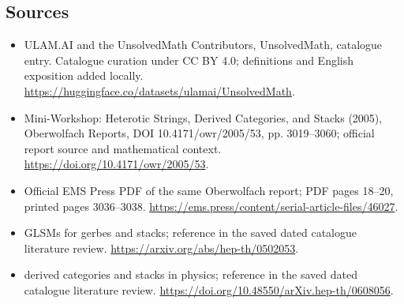 \documentclass[11pt]{article}
\begin{document}
\subsection{Sources}
\begin{itemize}
\item[\hypertarget{source:statement:1}{S1}] ULAM.AI and the UnsolvedMath Contributors, UnsolvedMath, catalogue entry. Catalogue curation under CC BY 4.0; definitions and English exposition added locally.
\url{https://huggingface.co/datasets/ulamai/UnsolvedMath}.
\item[\hypertarget{source:statement:2}{S2}] Mini-Workshop: Heterotic Strings, Derived Categories, and Stacks (2005), Oberwolfach Reports, DOI 10.4171/owr/2005/53, pp. 3019--3060; official report source and mathematical context.
\url{https://doi.org/10.4171/owr/2005/53}.
\item[\hypertarget{source:statement:3}{S3}] Official EMS Press PDF of the same Oberwolfach report; PDF pages 18--20, printed pages 3036--3038.
\url{https://ems.press/content/serial-article-files/46027}.
\item[\hypertarget{source:statement:4}{S4}] GLSMs for gerbes and stacks; reference in the saved dated catalogue literature review.
\url{https://arxiv.org/abs/hep-th/0502053}.
\item[\hypertarget{source:statement:5}{S5}] derived categories and stacks in physics; reference in the saved dated catalogue literature review.
\url{https://doi.org/10.48550/arXiv.hep-th/0608056}.
\end{itemize}
\label{end:statement}
\end{document}
